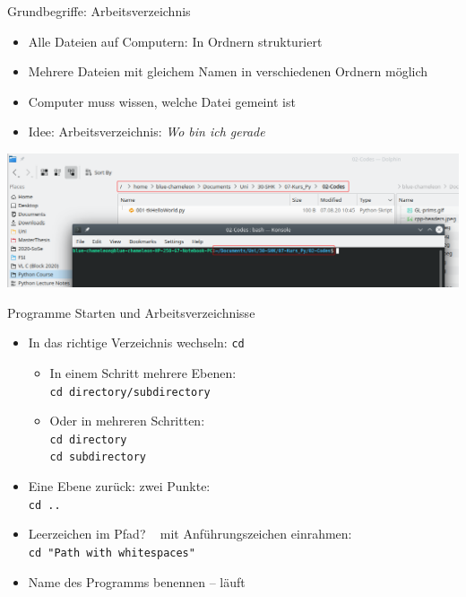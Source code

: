 \begin{frame}{Grundbegriffe: Arbeitsverzeichnis}
%
\begin{itemize}
\item Alle Dateien auf Computern: In Ordnern strukturiert
\item Mehrere Dateien mit gleichem Namen in verschiedenen Ordnern möglich
\item Computer muss wissen, welche Datei gemeint ist
\item Idee: Arbeitsverzeichnis: \emph{Wo bin ich gerade}
\end{itemize}
%
\includegraphics[width=\linewidth]{./gfx/paths}
%
\end{frame}


\begin{frame}{Programme Starten und Arbeitsverzeichnisse}
%
\begin{itemize}
\item In das richtige Verzeichnis wechseln: \texttt{cd}
	\begin{minipage}{\linewidth}
		\begin{minipage}{.49\linewidth}
		\begin{itemize}
		\item In einem Schritt mehrere Ebenen:\\
			\texttt{cd directory/subdirectory}
		\end{itemize}
		\end{minipage}
		\begin{minipage}{.49\linewidth}
		\begin{itemize}
		\item Oder in mehreren Schritten:\\
			\texttt{cd directory}\\
			\texttt{cd subdirectory}
		\end{itemize}
		\end{minipage}
	\end{minipage}
	\item Eine Ebene zurück: zwei Punkte:\\
		\texttt{cd ..}
	\item Leerzeichen im Pfad? \Thus ~ mit Anführungszeichen einrahmen:\\
		\texttt{cd "Path with whitespaces"}
\item Name des Programms benennen -- läuft
\end{itemize}
%
%
\end{frame}

